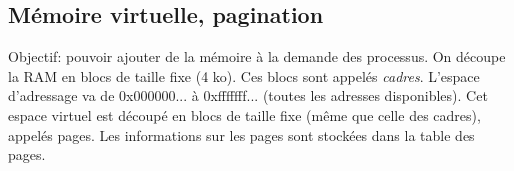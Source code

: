 \documentclass[10pt,a4paper]{article}
\begin{document}
		\subsection{Mémoire virtuelle, pagination}
			Objectif: pouvoir ajouter de la mémoire à la demande des processus. On découpe la RAM en blocs de taille fixe (4 ko). Ces blocs sont appelés \emph{cadres}. L'espace d'adressage va de 0x000000... à 0xfffffff... (toutes les adresses disponibles). Cet espace virtuel est découpé en blocs de taille fixe (même que celle des cadres), appelés pages. Les informations sur les pages sont stockées dans la table des pages.
\end{document}
